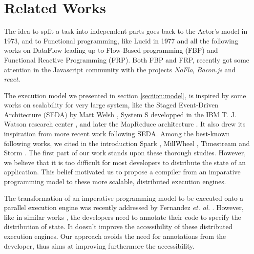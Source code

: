 \section{Related Works} \label{section:related}

The idea to split a task into independent parts goes back to the Actor's model \cite{Hewitt1973} in 1973, and to Functional programming, like Lucid \cite{Ashcroft1977} in 1977 and all the following works on DataFlow leading up to Flow-Based programming (FBP) and Functional Reactive Programming (FRP).
Both FBP and FRP, recently got some attention in the Javascript community with the projects \textit{NoFlo}, \textit{Bacon.js} and \textit{react}.

The execution model we presented in section \ref{section:model}, is inspired by some works on scalability for very large system, like the Staged Event-Driven Architecture (SEDA) by Matt Welsh \cite{Welsh2000}, System S developped in the IBM T. J. Watson research center \cite{Jain2006,Wu2007}, and later the MapReduce architecture \cite{Dean2008}.
It also drew its inspiration from more recent work following SEDA.
Among the best-known following works, we cited in the introduction Spark \cite{Zaharia2010, Zaharia2012}, MillWheel \cite{Akidau2013}, Timestream \cite{Qian2013} and Storm \cite{Toshniwal2014}.
The first part of our work stands upon these thorough studies.
However, we believe that it is too difficult for most developers to distribute the state of an application.
This belief motivated us to propose a compiler from an imparative programming model to these more scalable, distributed execution engines.


The transformation of an imperative programming model to be executed onto a parallel execution engine was recently addressed by Fernandez \textit{et. al.} \cite{Fernandez2014a}.
However, like in similar works \cite{Mitchell2012,Power2010}, the developers need to annotate their code to specify the distribution of state.
It doesn't improve the accessibility of these distributed execution engines.
Our approach avoids the need for annotations from the developer, thus aims at improving furthermore the accessibility.

